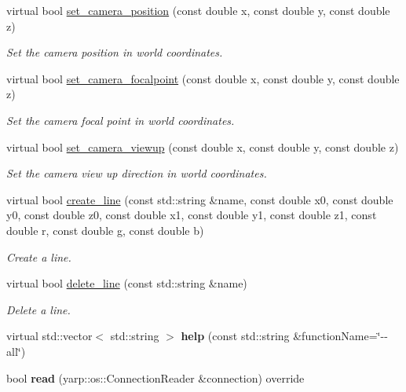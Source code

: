 \begin{DoxyCompactItemize}
\item 
virtual bool \mbox{\hyperlink{classskeletonViewer__IDL_afdff1c47b3874a112c5fe601b2b9fac6}{set\+\_\+camera\+\_\+position}} (const double x, const double y, const double z)
\begin{DoxyCompactList}\small\item\em Set the camera position in world coordinates. \end{DoxyCompactList}\item 
virtual bool \mbox{\hyperlink{classskeletonViewer__IDL_a6b603079ea6fd21663de28091b9a1719}{set\+\_\+camera\+\_\+focalpoint}} (const double x, const double y, const double z)
\begin{DoxyCompactList}\small\item\em Set the camera focal point in world coordinates. \end{DoxyCompactList}\item 
virtual bool \mbox{\hyperlink{classskeletonViewer__IDL_addc168b73a8279fa6c146e4a7365cd77}{set\+\_\+camera\+\_\+viewup}} (const double x, const double y, const double z)
\begin{DoxyCompactList}\small\item\em Set the camera view up direction in world coordinates. \end{DoxyCompactList}\item 
virtual bool \mbox{\hyperlink{classskeletonViewer__IDL_ae893be656a21bfd75682fd4efb20a2d8}{create\+\_\+line}} (const std\+::string \&name, const double x0, const double y0, const double z0, const double x1, const double y1, const double z1, const double r, const double g, const double b)
\begin{DoxyCompactList}\small\item\em Create a line. \end{DoxyCompactList}\item 
virtual bool \mbox{\hyperlink{classskeletonViewer__IDL_a3a1f90f10689c4411e522d41d5d19908}{delete\+\_\+line}} (const std\+::string \&name)
\begin{DoxyCompactList}\small\item\em Delete a line. \end{DoxyCompactList}\item 
\mbox{\label{classskeletonViewer__IDL_a970ce92704e75f8f8a4e663aace17436}} 
virtual std\+::vector$<$ std\+::string $>$ {\bfseries help} (const std\+::string \&function\+Name=\char`\"{}-\/-\/all\char`\"{})
\item 
\mbox{\label{classskeletonViewer__IDL_ae6e019ed8b536029c204defd60c7d63b}} 
bool {\bfseries read} (yarp\+::os\+::\+Connection\+Reader \&connection) override
\end{DoxyCompactItemize}


